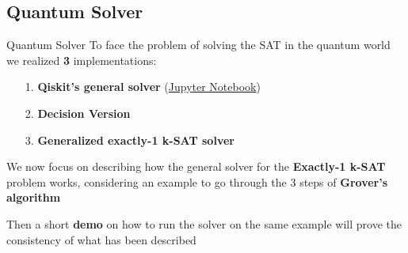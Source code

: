 	\subsection{Quantum Solver}
		\begin{frame}{Quantum Solver}
			To face the problem of solving the SAT in the quantum world we realized \textbf{3} implementations:
			\begin{itemize} %
				\item[1.] \textbf{Qiskit's general solver} (\href{https://github.com/Askarpour/sw2_quantum_research/blob/master/Piro/Code/Quantum/quantumSat.ipynb}{Jupyter Notebook})
				
				\item[2.] \textbf{Decision Version}
				
				\item[3.] \textbf{Generalized exactly-1 k-SAT solver}
			\end{itemize}
			We now focus on describing how the general solver for the \textbf{Exactly-1 k-SAT} problem works, considering an example to go through the 3 steps of \textbf{Grover's algorithm}\\
			
			\vspace{0.3cm}
			
			Then a short \textbf{demo} on how to run the solver on the same example will prove the consistency of what has been described
		\end{frame}
	
